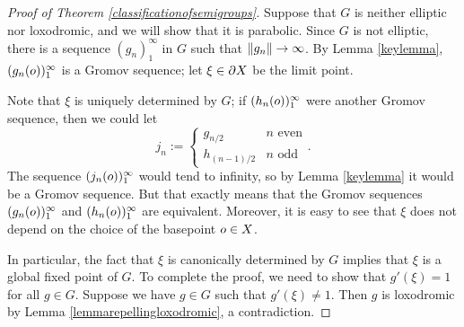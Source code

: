 \begin{proof}[Proof of Theorem \ref{classificationofsemigroups}]%
Suppose that $G$ is neither elliptic nor loxodromic, and we will show that it is parabolic. Since $G$ is not elliptic, there is a sequence $(g_n)_1^\infty$ in $G$ such that $\|g_n\| \to \infty$. By Lemma \ref{keylemma}, $(g_n(o))_1^\infty$ is a Gromov sequence; let $\xi\in\partial X$ be the limit point.

Note that $\xi$ is uniquely determined by $G$; if $(h_n(o))_1^\infty$ were another Gromov sequence, then we could let
\[
j_n := \begin{cases}
g_{n/2} & n\text{ even}\\
h_{(n - 1)/2} & n\text{ odd}
\end{cases}.
\]
The sequence $(j_n(o))_1^\infty$ would tend to infinity, so by Lemma \ref{keylemma} it would be a Gromov sequence. But that exactly means that the Gromov sequences $(g_n(o))_1^\infty$ and $(h_n(o))_1^\infty$ are equivalent. Moreover, it is easy to see that $\xi$ does not depend on the choice of the basepoint $o\in X$.

In particular, the fact that $\xi$ is canonically determined by $G$ implies that $\xi$ is a global fixed point of $G$. To complete the proof, we need to show that $g'(\xi) = 1$ for all $g\in G$. Suppose we have $g\in G$ such that $g'(\xi)\neq 1$. Then $g$ is loxodromic by Lemma \ref{lemmarepellingloxodromic}, a contradiction.
\end{proof}
%
%
%
%



